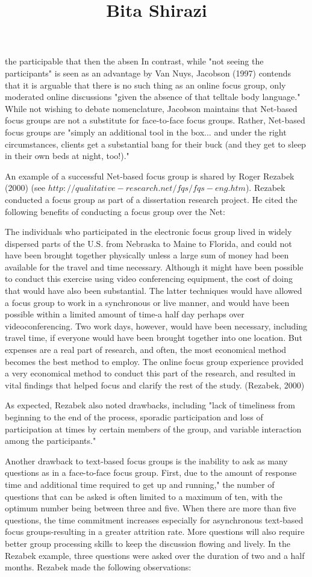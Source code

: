 \documentclass [8pt]{beamer}
\title{Bita Shirazi}
\author{}
\date{}
\begin{document}
\small
\begin{frame}
\justifying	
the participable that then the absen
In contrast, while "not seeing the participants" is seen as an advantage by Van Nuys, Jacobson (1997) contends that it is arguable that there is no such thing as an online focus group, only moderated online discussions "given the absence of that telltale body language." While not wishing to debate nomenclature, Jacobson maintains that Net-based focus groups are not a substitute for face-to-face focus groups. Rather, Net-based focus groups are "simply an additional tool in the box... and under the right circumstances, clients get a substantial bang for their buck (and they get to sleep in their own beds at night, too!)."

An example of a successful Net-based focus group is shared by Roger Rezabek (2000) (see  $ http://qualitative-research.net/fqs/fqs-eng.htm$). Rezabek conducted a focus group as part of a dissertation research project. He cited the following benefits of conducting a focus group over the Net:

	The individuals who participated in the electronic focus group lived in widely dispersed parts of the U.S. from Nebraska to Maine to Florida, and could not have been brought together physically unless a large sum of money had been available for the travel and time necessary. Although it might have been possible to conduct this exercise using video conferencing equipment, the cost of doing that would have also been substantial. The latter techniques would have allowed a focus group to work in a synchronous or live manner, and would have been possible within a limited amount of time-a half day perhaps over videoconferencing. Two work days, however, would have been necessary, including travel time, if everyone would have been brought together into one location. But expenses are a real part of research, and often, the most economical method becomes the best method to employ. The online focus group experience provided a very economical method to conduct this part of the research, and resulted in vital findings that helped focus and clarify the rest of the study. (Rezabek, 2000)


As expected, Rezabek also noted drawbacks, including "lack of timeliness from beginning to the end of the process, sporadic participation and loss of participation at times by certain members of the group, and variable interaction among the participants."

Another drawback to text-based focus groups is the inability to ask as many questions as in a face-to-face focus group. First, due to the amount of response time and additional time required to get up and running," the number of questions that can be asked is often limited to a maximum of ten, with the optimum number being between three and five. When there are more than five questions, the time commitment increases especially for asynchronous text-based focus groups-resulting in a greater attrition rate. More questions will also require better group processing skills to keep the discussion flowing and lively. In the Rezabek example, three questions were asked over the duration of two and a half months. Rezabek made the following observations:
\end{frame}
\end{document}

